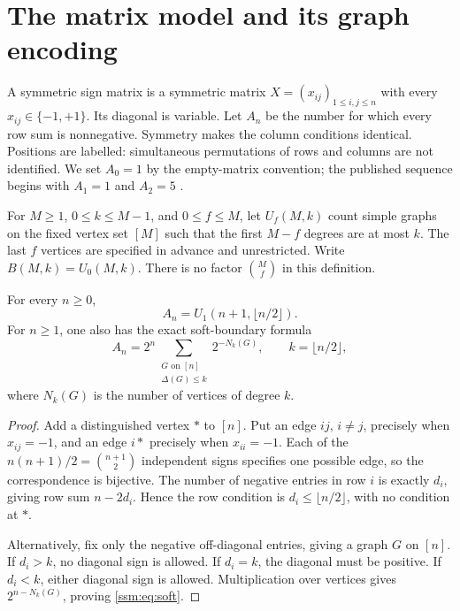 \section{The matrix model and its graph encoding}\label{ssm:sec:model}
A symmetric sign matrix is a symmetric matrix $X=(x_{ij})_{1\le i,j\le n}$ with every $x_{ij}\in\{-1,+1\}$. Its diagonal is variable. Let $A_n$ be the number for which every row sum is nonnegative. Symmetry makes the column conditions identical. Positions are labelled: simultaneous permutations of rows and columns are not identified. We set $A_0=1$ by the empty-matrix convention; the published sequence begins with $A_1=1$ and $A_2=5$ \cite{oeis}.

For $M\ge1$, $0\le k\le M-1$, and $0\le f\le M$, let $U_f(M,k)$ count simple graphs on the fixed vertex set $[M]$ such that the first $M-f$ degrees are at most $k$. The last $f$ vertices are specified in advance and unrestricted. Write $B(M,k)=U_0(M,k)$. There is no factor $\binom Mf$ in this definition.

\begin{proposition}\label{ssm:prop:bridge}
For every $n\ge0$,
\begin{equation}\label{ssm:eq:bridge}
 A_n=U_1(n+1,\lfloor n/2\rfloor).
\end{equation}
For $n\ge1$, one also has the exact soft-boundary formula
\begin{equation}\label{ssm:eq:soft}
 A_n=2^n\sum_{\substack{G\text{ on }[n]\\\Delta(G)\le k}}2^{-N_k(G)},
 \qquad k=\lfloor n/2\rfloor,
\end{equation}
where $N_k(G)$ is the number of vertices of degree $k$.
\end{proposition}
\begin{proof}
Add a distinguished vertex $*$ to $[n]$. Put an edge $ij$, $i\ne j$, precisely when $x_{ij}=-1$, and an edge $i*$ precisely when $x_{ii}=-1$. Each of the $n(n+1)/2=\binom{n+1}{2}$ independent signs specifies one possible edge, so the correspondence is bijective. The number of negative entries in row $i$ is exactly $d_i$, giving row sum $n-2d_i$. Hence the row condition is $d_i\le\lfloor n/2\rfloor$, with no condition at $*$.

Alternatively, fix only the negative off-diagonal entries, giving a graph $G$ on $[n]$. If $d_i>k$, no diagonal sign is allowed. If $d_i=k$, the diagonal must be positive. If $d_i<k$, either diagonal sign is allowed. Multiplication over vertices gives $2^{n-N_k(G)}$, proving \eqref{ssm:eq:soft}.
\end{proof}

